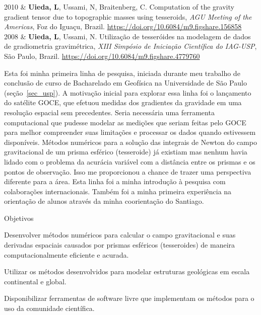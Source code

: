 \documentclass[12pt,a4paper,oneside]{book}
\newcommand{\USP}{Universidade de São Paulo}
\newcommand{\Me}{\textbf{Uieda, L}}
\newcommand{\Carla}{Braitenberg, C}
\newcommand{\Naomi}{Ussami, N}
\newcommand{\DOI}[1]{\url{https://doi.org/#1}}
\begin{document}
\begin{subsummarybox}[frametitle=\faComment{}\quad Outras apresentações]
  \begin{paperlist}
    2010 & \Me, \Naomi, \Carla.
      Computation of the gravity gradient tensor due to topographic masses
      using tesseroids,
      \emph{AGU Meeting of the Americas},
      Foz do Iguaçu, Brazil.
      \DOI{10.6084/m9.figshare.156858}
      \\
    2008 & \Me, \Naomi.
      Utilização de tesseróides na modelagem de dados de gradiometria
      gravimétrica,
      \emph{XIII Simpósio de Iniciação Científica do IAG-USP},
      São Paulo, Brazil.
      \DOI{10.6084/m9.figshare.4779760}
  \end{paperlist}
\end{subsummarybox}

Esta foi minha primeira linha de pesquisa, iniciada durante meu trabalho de
conclusão de curso de Bacharelado em Geofísica na \USP{}
(seção~\ref{sec_usp}).
A motivação inicial para explorar essa linha foi o lançamento do satélite
GOCE, que efetuou medidas dos gradientes da gravidade em uma resolução espacial
sem precedentes.
Seria necessária uma ferramenta computacional que pudesse modelar as medições
que seriam feitas pelo GOCE para melhor compreender suas limitações e processar
os dados quando estivessem disponíveis.
Métodos numéricos para a solução das integrais de Newton do campo gravitacional
de um prisma esférico (tesseroide) já existiam
\citep{Heck2006,Asgharzadeh2007,WildPfeiffer2008} mas nenhum havia lidado com o
problema da acurácia variável com a distância entre os prismas e os pontos de
observação.
Isso me proporcionou a chance de trazer uma perspectiva diferente para a área.
Esta linha foi a minha introdução à pesquisa com colaborações internacionais.
Também foi a minha primeira experiência na orientação de alunos através da
minha coorientação do Santiago.

\begin{fancyenum}{\faBullseye}{Objetivos}
  \item Desenvolver métodos numéricos para calcular o campo gravitacional e
    suas derivadas espaciais causados por prismas esféricos (tesseroides) de
    maneira computacionalmente eficiente e acurada.
  \item Utilizar os métodos desenvolvidos para modelar estruturas geológicas em
    escala continental e global.
  \item Disponibilizar ferramentas de software livre que implementam os métodos
    para o uso da comunidade científica.
\end{fancyenum}
\end{document}
